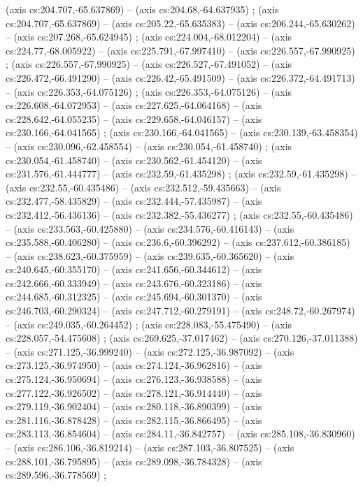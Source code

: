     (axis cs:204.707,-65.637869) --  (axis cs:204.68,-64.637935) ;
    (axis cs:204.707,-65.637869) --  (axis cs:205.22,-65.635383) --  (axis cs:206.244,-65.630262) --  (axis cs:207.268,-65.624945) ;
    (axis cs:224.004,-68.012204) --  (axis cs:224.77,-68.005922) --  (axis cs:225.791,-67.997410) --  (axis cs:226.557,-67.990925) ;
    (axis cs:226.557,-67.990925) --  (axis cs:226.527,-67.491052) --  (axis cs:226.472,-66.491290) --  (axis cs:226.42,-65.491509) --  (axis cs:226.372,-64.491713) --  (axis cs:226.353,-64.075126) ;
    (axis cs:226.353,-64.075126) --  (axis cs:226.608,-64.072953) --  (axis cs:227.625,-64.064168) --  (axis cs:228.642,-64.055235) --  (axis cs:229.658,-64.046157) --  (axis cs:230.166,-64.041565) ;
    (axis cs:230.166,-64.041565) --  (axis cs:230.139,-63.458354) --  (axis cs:230.096,-62.458554) --  (axis cs:230.054,-61.458740) ;
    (axis cs:230.054,-61.458740) --  (axis cs:230.562,-61.454120) --  (axis cs:231.576,-61.444777) --  (axis cs:232.59,-61.435298) ;
    (axis cs:232.59,-61.435298) --  (axis cs:232.55,-60.435486) --  (axis cs:232.512,-59.435663) --  (axis cs:232.477,-58.435829) --  (axis cs:232.444,-57.435987) --  (axis cs:232.412,-56.436136) --  (axis cs:232.382,-55.436277) ;
    (axis cs:232.55,-60.435486) --  (axis cs:233.563,-60.425880) --  (axis cs:234.576,-60.416143) --  (axis cs:235.588,-60.406280) --  (axis cs:236.6,-60.396292) --  (axis cs:237.612,-60.386185) --  (axis cs:238.623,-60.375959) --  (axis cs:239.635,-60.365620) --  (axis cs:240.645,-60.355170) --  (axis cs:241.656,-60.344612) --  (axis cs:242.666,-60.333949) --  (axis cs:243.676,-60.323186) --  (axis cs:244.685,-60.312325) --  (axis cs:245.694,-60.301370) --  (axis cs:246.703,-60.290324) --  (axis cs:247.712,-60.279191) --  (axis cs:248.72,-60.267974) --  (axis cs:249.035,-60.264452) ;
    (axis cs:228.083,-55.475490) --  (axis cs:228.057,-54.475608) ;
    (axis cs:269.625,-37.017462) --  (axis cs:270.126,-37.011388) --  (axis cs:271.125,-36.999240) --  (axis cs:272.125,-36.987092) --  (axis cs:273.125,-36.974950) --  (axis cs:274.124,-36.962816) --  (axis cs:275.124,-36.950694) --  (axis cs:276.123,-36.938588) --  (axis cs:277.122,-36.926502) --  (axis cs:278.121,-36.914440) --  (axis cs:279.119,-36.902404) --  (axis cs:280.118,-36.890399) --  (axis cs:281.116,-36.878428) --  (axis cs:282.115,-36.866495) --  (axis cs:283.113,-36.854604) --  (axis cs:284.11,-36.842757) --  (axis cs:285.108,-36.830960) --  (axis cs:286.106,-36.819214) --  (axis cs:287.103,-36.807525) --  (axis cs:288.101,-36.795895) --  (axis cs:289.098,-36.784328) --  (axis cs:289.596,-36.778569) ;
